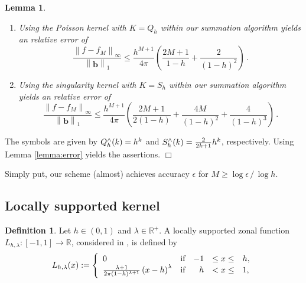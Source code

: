 \documentclass[11pt,a4paper,twoside,bibtotoc]{scrartcl}
\theoremstyle{plain}
\newtheorem{lemma}[theorem]{Lemma}
\theoremstyle{definition}
\newtheorem{definition}[theorem]{Definition}
\theoremstyle{remark}
\newenvironment{proof}{{\bf Proof.}}{$\Box$}
\newcommand{\R}{\ensuremath{\mathbb{R}}}
\newcommand{\Rp}{\ensuremath{\mathbb{R}^{+}}}
\newcommand{\interv}[4]{\ensuremath{\left#1\left.#2,#3\right#4\right.}}
\newcommand{\fun}[2]{\ensuremath{#1{\hspace{-0.4ex}}\left(#2\right)}}
\newcommand{\paren}[1]{\ensuremath{\left(#1\right)}}
\newcommand{\mb}[1]{\mathbf{#1}}
\newcommand{\V}[1]{\mb{#1}}
\numberwithin{equation}{section}
\numberwithin{table}{section}
\numberwithin{figure}{section}
\begin{document}
\begin{lemma}
 \begin{enumerate}
   \item 
Using the Poisson kernel with $K=Q_h$ within our summation algorithm yields an relative error of
     \begin{equation}
       \label{error:poisson}
       \frac{\left\|f - f_{M}\right\|_{\infty}}{\left\|\V{b}\right\|_1} \le
       \frac{h^{M+1}}{4\pi}
       \left(\frac{2M+1}{1-h}+\frac{2}{\left(1-h\right)^2}\right)\, .
     \end{equation}
     \item 
Using the singularity kernel with $K=S_h$ within our summation algorithm yields an relative error of
       \begin{equation}
         \label{error:singular}
         \frac{\left\|f - f_{M}\right\|_{\infty}}{\left\|\V{b}\right\|_1} \le
         \frac{h^{M+1}}{4\pi} \left(\frac{2M+1}{2\left(1-h\right)}+
           \frac{4M}{\left(1-h\right)^2}+
         \frac{4}{\left(1-h\right)^3}\right)\, .
       \end{equation}
 \end{enumerate}
\end{lemma}
\begin{proof}
The symbols are given by $\fun{Q_{h}^{\wedge}}{k}=h^k$ and
$\fun{S_{h}^{\wedge}}{k}=\frac{2}{2k+1}h^k$, respectively.
Using Lemma \ref{lemma:error} yields the assertions.
\end{proof}
  
Simply put, our scheme (almost) achieves accuracy $\epsilon$ for $M \ge \log\epsilon \,
/ \, \log h$.

\subsection{Locally supported kernel}
\begin{definition}
  Let $h \in \interv{(}{0}{1}{)}$ and $\lambda \in \Rp$.
  A locally supported zonal function
    $L_{h,\lambda}:\interv{[}{-1}{1}{]} \rightarrow \R$, considered in
    \cite{Sc97}, is defined by
    \[
    \fun{L_{h,\lambda}}{x} := 
    \left\{\begin{array}{l@{\quad \text{if} \quad}rcl} 
        0 & -1 &\le x \le& h, \\
        \frac{\lambda+1}{2\pi(1-h)^{\lambda+1}}\paren{x-h}^{\lambda} &  h & <  x \le& 1,
      \end{array}\right.
    \]
\end{definition}
\end{document}
